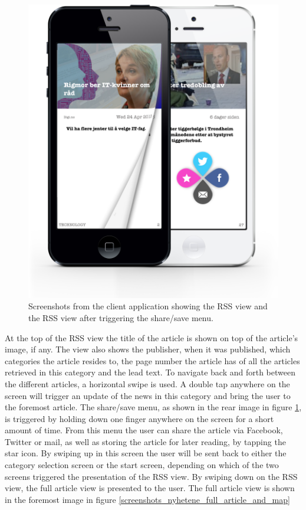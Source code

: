 \begin{figure}[!htbp]
\centering
\includegraphics[width=120mm]{GFX/clientApp/rssViewAndShare.png}
\caption{Screenshots from the client application showing the RSS view and the RSS view after triggering the share/save menu.}
\label{screenshots_nyhetene_rss_and_share}
\end{figure}

At the top of the RSS view the title of the article is shown on top of the article's image, if any. The view also shows the publisher, when it was published, which categories the article resides to, the page number the article has of all the articles retrieved in this category and the lead text. To navigate back and forth between the different articles, a horizontal swipe is used. A double tap anywhere on the screen will trigger an update of the news in this category and bring the user to the foremost article. The share/save menu, as shown in the rear image in figure \ref{screenshots_nyhetene_rss_and_share}, is triggered by holding down one finger anywhere on the screen for a short amount of time. From this menu the user can share the article via Facebook, Twitter or mail, as well as storing the article for later reading, by tapping the star icon. By swiping up in this screen the user will be sent back to either the category selection screen or the start screen, depending on which of the two screens triggered the presentation of the RSS view. By swiping down on the RSS view, the full article view is presented to the user. The full article view is shown in the foremost image in figure \ref{screenshots_nyhetene_full_article_and_map}



